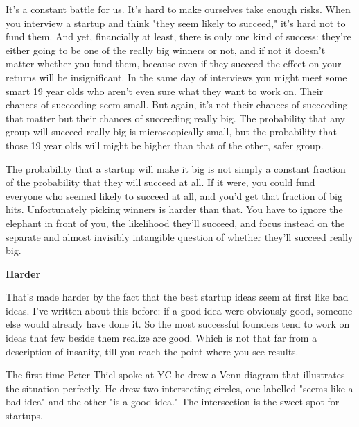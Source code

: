 It's a constant
                    battle for us. It's hard to make ourselves take enough
                    risks. When you interview a startup and think "they seem
                    likely to succeed," it's hard not to fund them. And yet,
                    financially at least, there is only one kind of success:
                    they're either going to be one of the really big winners or
                    not, and if not it doesn't matter whether you fund them,
                    because even if they succeed the effect on your returns will
                    be insignificant. In the same day of interviews you might
                    meet some smart 19 year olds who aren't even sure what they
                    want to work on. Their chances of succeeding seem small. But
                    again, it's not their chances of succeeding that matter but
                    their chances of succeeding really big. The probability that
                    any group will succeed really big is microscopically small,
                    but the probability that those 19 year olds will might be
                    higher than that of the other, safer group.

The
                    probability that a startup will make it big is not simply a
                    constant fraction of the probability that they will succeed
                    at all. If it were, you could fund everyone who seemed
                    likely to succeed at all, and you'd get that fraction of big
                    hits. Unfortunately picking winners is harder than that. You
                    have to ignore the elephant in front of you, the likelihood
                    they'll succeed, and focus instead on the separate and
                    almost invisibly intangible question of whether they'll
                    succeed really big.

\textbf{Harder}

That's made harder by the fact that the best
                    startup ideas seem at first like bad ideas. I've written
                    about this before: if a good idea were obviously good,
                    someone else would already have done it. So the most
                    successful founders tend to work on ideas that few beside
                    them realize are good. Which is not that far from a
                    description of insanity, till you reach the point where you
                    see results.

The first time Peter Thiel spoke at
                    YC he drew a Venn diagram that illustrates the situation
                    perfectly. He drew two intersecting circles, one labelled
                    "seems like a bad idea" and the other "is a good idea." The
                    intersection is the sweet spot for startups.


